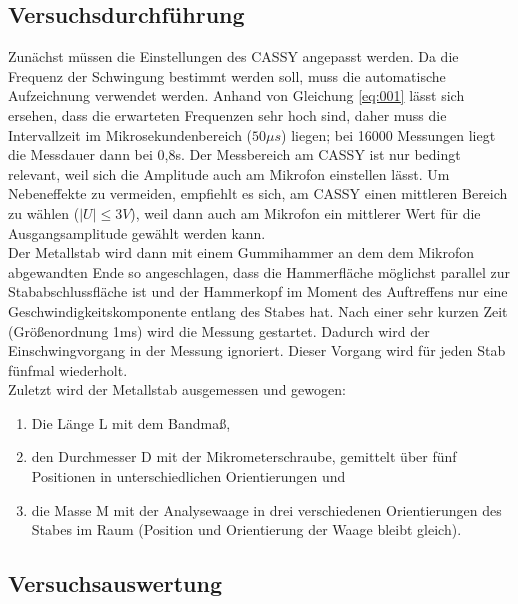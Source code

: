 \documentclass[12pt,a4paper]{article}
\begin{document}
\subsection{Versuchsdurchführung}
Zunächst müssen die Einstellungen des CASSY angepasst werden. Da die Frequenz der Schwingung bestimmt werden soll, muss die automatische Aufzeichnung verwendet werden. Anhand von Gleichung \eqref{eq:001} lässt sich ersehen, dass die erwarteten Frequenzen sehr hoch sind, daher muss die Intervallzeit im Mikrosekundenbereich ($50 \mu s$) liegen; bei 16000 Messungen liegt die Messdauer dann bei 0,8s. Der Messbereich am CASSY ist nur bedingt relevant, weil sich die Amplitude auch am Mikrofon einstellen lässt. Um Nebeneffekte zu vermeiden, empfiehlt es sich, am CASSY einen mittleren Bereich zu wählen ($|U| \leq 3V$), weil dann auch am Mikrofon ein mittlerer Wert für die Ausgangsamplitude gewählt werden kann. \\

Der Metallstab wird dann mit einem Gummihammer an dem dem Mikrofon abgewandten Ende so angeschlagen, dass die Hammerfläche möglichst parallel zur Stababschlussfläche ist und der Hammerkopf im Moment des Auftreffens nur eine Geschwindigkeitskomponente entlang des Stabes hat. Nach einer sehr kurzen Zeit (Größenordnung 1ms) wird die Messung gestartet. Dadurch wird der Einschwingvorgang in der Messung ignoriert. Dieser Vorgang wird für jeden Stab fünfmal wiederholt. \\

Zuletzt wird der Metallstab ausgemessen und gewogen:
\begin{enumerate}
\item Die Länge L mit dem Bandmaß,
\item den Durchmesser D mit der Mikrometerschraube, gemittelt über fünf Positionen in unterschiedlichen Orientierungen und 
\item die Masse M mit der Analysewaage in drei verschiedenen Orientierungen des Stabes im Raum (Position und Orientierung der Waage bleibt gleich).
\end{enumerate}
\subsection{Versuchsauswertung}
\end{document}
